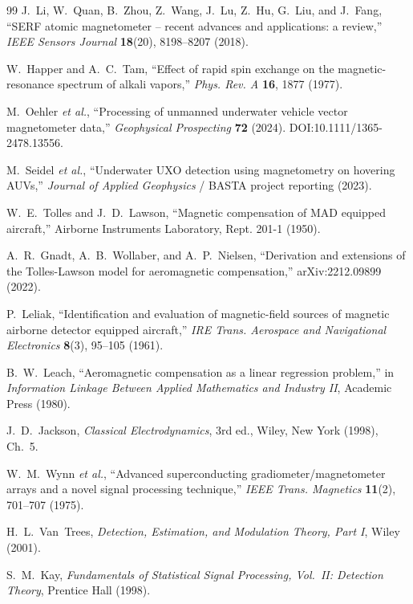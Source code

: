 \documentclass[11pt]{article}
\begin{document}
\begin{thebibliography}{99}
 J.~Li, W.~Quan, B.~Zhou, Z.~Wang, J.~Lu, Z.~Hu, G.~Liu, and
J.~Fang, ``SERF atomic magnetometer -- recent advances and applications: a
review,'' \emph{IEEE Sensors Journal} \textbf{18}(20), 8198--8207 (2018).

 W.~Happer and A.~C.~Tam, ``Effect of rapid spin exchange on
the magnetic-resonance spectrum of alkali vapors,'' \emph{Phys. Rev. A}
\textbf{16}, 1877 (1977).

 M.~Oehler \emph{et al.}, ``Processing of unmanned underwater
vehicle vector magnetometer data,'' \emph{Geophysical Prospecting} \textbf{72}
(2024). DOI:10.1111/1365-2478.13556.

 M.~Seidel \emph{et al.}, ``Underwater UXO detection using
magnetometry on hovering AUVs,'' \emph{Journal of Applied Geophysics} / BASTA
project reporting (2023).

 W.~E.~Tolles and J.~D.~Lawson, ``Magnetic compensation of
MAD equipped aircraft,'' Airborne Instruments Laboratory, Rept. 201-1 (1950).

 A.~R.~Gnadt, A.~B.~Wollaber, and A.~P.~Nielsen, ``Derivation
and extensions of the Tolles-Lawson model for aeromagnetic compensation,''
arXiv:2212.09899 (2022).

 P.~Leliak, ``Identification and evaluation of magnetic-field
sources of magnetic airborne detector equipped aircraft,'' \emph{IRE Trans.
Aerospace and Navigational Electronics} \textbf{8}(3), 95--105 (1961).

 B.~W.~Leach, ``Aeromagnetic compensation as a linear
regression problem,'' in \emph{Information Linkage Between Applied Mathematics
and Industry II}, Academic Press (1980).

 J.~D.~Jackson, \emph{Classical Electrodynamics}, 3rd ed.,
Wiley, New York (1998), Ch.~5.

 W.~M.~Wynn \emph{et al.}, ``Advanced superconducting
gradiometer/magnetometer arrays and a novel signal processing technique,''
\emph{IEEE Trans. Magnetics} \textbf{11}(2), 701--707 (1975).

 H.~L.~Van~Trees, \emph{Detection, Estimation, and
Modulation Theory, Part I}, Wiley (2001).

 S.~M.~Kay, \emph{Fundamentals of Statistical Signal Processing,
Vol.~II: Detection Theory}, Prentice Hall (1998).


\end{thebibliography}
\end{document}
